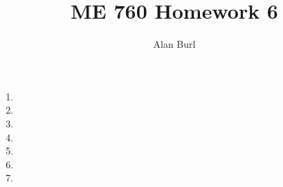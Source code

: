 \documentclass[12pt]{article}
\author{Alan Burl}
\title{ME 760 Homework 6}
\begin{document}
\maketitle
\clearpage
\begin{enumerate}
	\item \clearpage %
	\item \clearpage %
	\item \clearpage %
	\item \clearpage %
	\item \clearpage %
	\item \clearpage 
	\item \clearpage

\end{enumerate}
\clearpage
\end{document}
